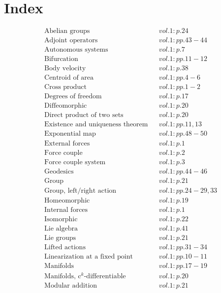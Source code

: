 \documentclass[a4paper]{article}
\begin{document}
 
\section*{Index} 
\begin{align*} 
&\text{Abelian groups}&& vol. 1: p. 24\\
&\text{Adjoint operators}&& vol. 1: pp. 43-44\\
&\text{Autonomous systems}&& vol. 1: p. 7\\
&\text{Bifurcation}&& vol. 1: pp. 11-12\\
&\text{Body velocity}&& vol. 1: p. 38\\
&\text{Centroid of area}&& vol. 1: pp. 4-6\\
&\text{Cross product}&& vol. 1: pp. 1-2\\
&\text{Degrees of freedom}&& vol. 1: p. 17\\
&\text{Diffeomorphic}&& vol. 1: p. 20\\
&\text{Direct product of two sets}&& vol. 1: p. 20\\
&\text{Existence and uniqueness theorem}&& vol. 1: pp. 11, 13\\
&\text{Exponential map}&& vol. 1: pp. 48-50\\
&\text{External forces}&& vol. 1: p. 1\\
&\text{Force couple}&& vol. 1: p. 2\\
&\text{Force couple system}&& vol. 1: p. 3\\
&\text{Geodesics}&& vol. 1: pp. 44-46\\
&\text{Group}&& vol. 1: p. 21\\
&\text{Group, left/right action}&& vol. 1: pp. 24-29, 33\\
&\text{Homeomorphic}&& vol. 1: p. 19\\
&\text{Internal forces}&& vol. 1: p. 1\\
&\text{Isomorphic}&& vol. 1: p. 22\\
&\text{Lie algebra}&& vol. 1: p. 41\\
&\text{Lie groups}&& vol. 1: p. 21\\
&\text{Lifted actions}&& vol. 1: pp. 31-34\\
&\text{Linearization at a fixed point}&& vol. 1: pp. 10-11\\
&\text{Manifolds}&& vol. 1: pp. 17-19\\
&\text{Manifolds, c$^k$-differentiable}&& vol. 1: p. 20\\
&\text{Modular addition}&& vol. 1: p. 21\\

\end{align*}
\end{document}
